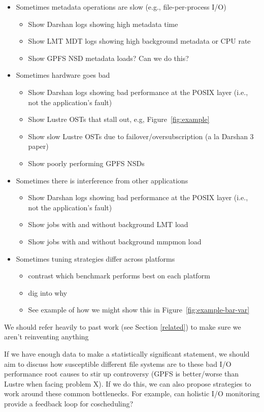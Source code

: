\documentclass[conference,10pt,compsocconf]{IEEEtran}
\begin{document}
\begin{itemize}
\item Sometimes metadata operations are slow (e.g., file-per-process I/O)
    \begin{itemize}
    \item Show Darshan logs showing high metadata time
    \item Show LMT MDT logs showing high background metadata or CPU rate
    \item Show GPFS NSD metadata loads?  Can we do this?
    \end{itemize}
\item Sometimes hardware goes bad
    \begin{itemize}
    \item Show Darshan logs showing bad performance at the POSIX layer (i.e., not the
    application's fault)
    \item Show Lustre OSTs that stall out, e.g, Figure~\ref{fig:example}
    \item Show slow Lustre OSTs due to failover/oversubscription (a la Darshan 3 paper)
    \item Show poorly performing GPFS NSDs
    \end{itemize}
\item Sometimes there is interference from other applications
    \begin{itemize}
    \item Show Darshan logs showing bad performance at the POSIX layer (i.e., not the
    application's fault)
    \item Show jobs with and without background LMT load
    \item Show jobs with and without background mmpmon load
    \end{itemize}
\item Sometimes tuning strategies differ across platforms
    \begin{itemize}
    \item contrast which benchmark performs best on each platform
    \item dig into why
    \item See example of how we might show this in Figure~\ref{fig:example-bar-var}
    \end{itemize}
\end{itemize}

We should refer heavily to past work (see Section \ref{related}) to make sure we
aren't reinventing anything

If we have enough data to make a statistically significant statement, we should
aim to discuss how susceptible different file systems are to these bad I/O
performance root causes to stir up controversy (GPFS is better/worse than
Lustre when facing problem X).  If we do this, we can also propose strategies
to work around these common bottlenecks.  For example, can holistic I/O
monitoring provide a feedback loop for coscheduling?
\end{document}
